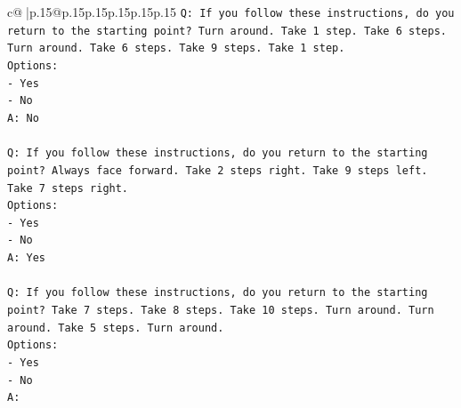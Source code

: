 \documentclass{article}
\begin{document}
{\begin{supertabular}{c@{$\;$}|p{.15\linewidth}@{}p{.15\linewidth}p{.15\linewidth}p{.15\linewidth}p{.15\linewidth}p{.15\linewidth}}
{{{\texttt{Q: If you follow these instructions, do you return to the starting point? Turn around. Take 1 step. Take 6 steps. Turn around. Take 6 steps. Take 9 steps. Take 1 step.} \\
\texttt{Options:} \\
\texttt{{-} Yes} \\
\texttt{{-} No} \\
\texttt{A: No} \\
\\ 
\texttt{Q: If you follow these instructions, do you return to the starting point? Always face forward. Take 2 steps right. Take 9 steps left. Take 7 steps right.} \\
\texttt{Options:} \\
\texttt{{-} Yes} \\
\texttt{{-} No} \\
\texttt{A: Yes} \\
\\ 
\texttt{Q: If you follow these instructions, do you return to the starting point? Take 7 steps. Take 8 steps. Take 10 steps. Turn around. Turn around. Take 5 steps. Turn around.} \\
\texttt{Options:} \\
\texttt{{-} Yes} \\
\texttt{{-} No} \\
\texttt{A:} \\
            }
        }
    }
     \\ \\


\end{supertabular}}
\end{document}
